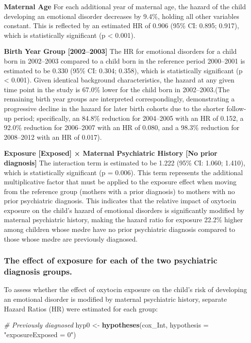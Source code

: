 \documentclass[
]{article}
\newenvironment{Shaded}{\begin{snugshade}}{\end{snugshade}}
\newcommand{\AttributeTok}[1]{\textcolor[rgb]{0.13,0.29,0.53}{#1}}
\newcommand{\CommentTok}[1]{\textcolor[rgb]{0.56,0.35,0.01}{\textit{#1}}}
\newcommand{\FunctionTok}[1]{\textcolor[rgb]{0.13,0.29,0.53}{\textbf{#1}}}
\newcommand{\NormalTok}[1]{#1}
\newcommand{\OtherTok}[1]{\textcolor[rgb]{0.56,0.35,0.01}{#1}}
\newcommand{\StringTok}[1]{\textcolor[rgb]{0.31,0.60,0.02}{#1}}
\begin{document}
\textbf{Maternal Age} For each additional year of maternal age, the
hazard of the child developing an emotional disorder decreases by 9.4\%,
holding all other variables constant. This is reflected by an estimated
HR of 0.906 (95\% CI: 0.895; 0.917), which is statistically significant
(p \textless{} 0.001).

\textbf{Birth Year Group {[}2002--2003{]}} The HR for emotional
disorders for a child born in 2002--2003 compared to a child born in the
reference period 2000--2001 is estimated to be 0.330 (95\% CI: 0.304;
0.358), which is statistically significant (p \textless{} 0.001). Given
identical background characteristics, the hazard at any given time point
in the study is 67.0\% lower for the child born in 2002--2003.(The
remaining birth year groups are interpreted correspondingly,
demonstrating a progressive decline in the hazard for later birth
cohorts due to the shorter follow-up period; specifically, an 84.8\%
reduction for 2004--2005 with an HR of 0.152, a 92.0\% reduction for
2006--2007 with an HR of 0.080, and a 98.3\% reduction for 2008--2012
with an HR of 0.017).

\textbf{Exposure {[}Exposed{]} × Maternal Psychiatric History {[}No
prior diagnosis{]}} The interaction term is estimated to be 1.222 (95\%
CI: 1.060; 1.410), which is statistically significant (p = 0.006). This
term represents the additional multiplicative factor that must be
applied to the exposure effect when moving from the reference group
(mothers with a prior diagnosis) to mothers with no prior psychiatric
diagnosis. This indicates that the relative impact of oxytocin exposure
on the child's hazard of emotional disorders is significantly modified
by maternal psychiatric history, making the hazard ratio for exposure
22.2\% higher among children whose mødre have no prior psychiatric
diagnosis compared to those whose mødre are previously diagnosed.

\subsubsection{The effect of exposure for each of the two psychiatric
diagnosis
groups.}\label{the-effect-of-exposure-for-each-of-the-two-psychiatric-diagnosis-groups.}

To assess whether the effect of oxytocin exposure on the child's risk of
developing an emotional disorder is modified by maternal psychiatric
history, separate Hazard Ratios (HR) were estimated for each group:

\begin{Shaded}
\begin{Highlighting}[]
\CommentTok{\# Previously diagnosed}
\NormalTok{hyp0 }\OtherTok{\textless{}{-}} \FunctionTok{hypotheses}\NormalTok{(cox\_Int,}
                   \AttributeTok{hypothesis =} \StringTok{"exposureExposed = 0"}\NormalTok{)}
\end{Highlighting}
\end{Shaded}
\end{document}
